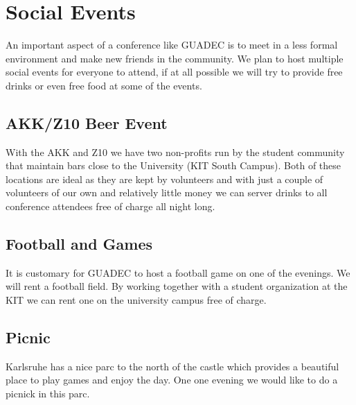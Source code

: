 \newpage

\section{Social Events}

An important aspect of a conference like GUADEC is to meet in a less formal
environment and make new friends in the community. We plan to host multiple
social events for everyone to attend, if at all possible we will try to
provide free drinks or even free food at some of the events.

\begin{multicols}{2}
\raggedcolumns

\subsection{AKK/Z10 Beer Event}

With the AKK and Z10 we have two non-profits run by the student community that
maintain bars close to the University (KIT South Campus).
Both of these locations are ideal as they are kept by volunteers and with just
a couple of volunteers of our own and relatively little money we can
server drinks to all conference attendees free of charge all night long.

\subsection{Football and Games}

It is customary for GUADEC to host a football game on one of the evenings. We will
rent a football field. By working together with a student organization at the
KIT we can rent one on the university campus free of charge.

\subsection{Picnic}

Karlsruhe has a nice parc to the north of the castle which provides a beautiful
place to play games and enjoy the day. One one evening we would like to do
a picnick in this parc.

\columnbreak


\end{multicols}
